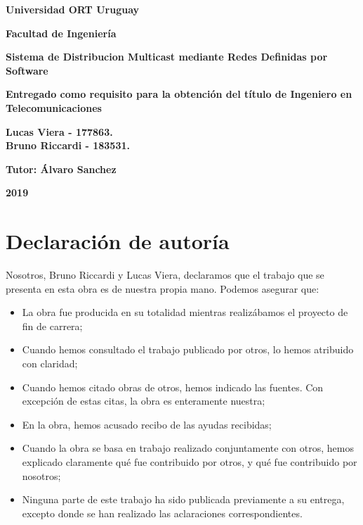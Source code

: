 \documentclass[12pt,a4paper,oneside]{book}
\begin{document}

\begin{center}
\thispagestyle{empty}

\begin{Large}
\textbf{Universidad ORT Uruguay}

\textbf{Facultad de Ingeniería}
\vspace{4cm}
\end{Large}


\begin{huge}
\textbf{Sistema de Distribucion Multicast mediante Redes Definidas por Software} 

\end{huge}

\vspace{2cm}

\textbf{Entregado como requisito para la obtención del título de Ingeniero en Telecomunicaciones}

\vspace{5cm}

\begin{large}
\textbf{Lucas Viera  - 177863.}\\
\textbf{Bruno Riccardi - 183531.}\\
\bigskip

\textbf{Tutor: Álvaro Sanchez}
\vspace{2cm}
\end{large}

\begin{huge}
\textbf{2019}
\end{huge}

\end{center}



\chapter*{Declaración de autoría}



Nosotros, Bruno Riccardi y Lucas Viera, declaramos que el trabajo que se presenta en esta obra es de nuestra
propia mano. Podemos asegurar que:
\begin{itemize}
\item La obra fue producida en su totalidad mientras realizábamos el proyecto de fin de carrera;
\item Cuando hemos consultado el trabajo publicado por otros, lo hemos atribuido con claridad;
\item Cuando hemos citado obras de otros, hemos indicado las fuentes. Con excepción de estas citas, la obra es enteramente nuestra;
\item En la obra, hemos acusado recibo de las ayudas recibidas;
\item Cuando la obra se basa en trabajo realizado conjuntamente con otros, hemos explicado claramente qué fue contribuido por otros, y qué fue contribuido por nosotros;
\item Ninguna parte de este trabajo ha sido publicada previamente a su entrega, excepto donde se han realizado las aclaraciones correspondientes.
\end{itemize}
\end{document}
